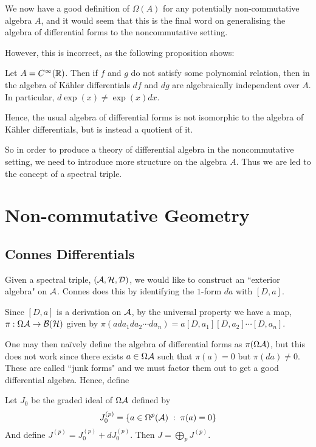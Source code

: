 We now have a good definition of $\Omega(A)$ for any potentially
non-commutative algebra $A$, and it would seem that this is the final
word on generalising the algebra of differential forms to the noncommutative setting.

However, this is incorrect, as the following proposition shows:
\begin{proposition}
    Let $A = C^\infty(\mathbb{R})$. Then if $f$ and $g$ do not satisfy some polynomial relation,
    then in the algebra of K\"ahler differentials $df$ and $dg$ are algebraically
    independent over $A$. In particular, $d\exp(x) \neq \exp(x)dx$. 
\end{proposition}

Hence, the usual algebra of differential forms is not isomorphic
to the algebra of K\"ahler differentials, but is instead a quotient of it. 

So in order to produce a theory of differential algebra in the noncommutative setting, we
need to introduce more structure on the algebra $A$. Thus we are
led to the concept of a spectral triple.

\section*{Non-commutative Geometry}
\subsection{Connes Differentials}
Given a spectral triple, $(\mathcal{A},\mathcal{H},\mathcal{D})$, we would like to construct an ``exterior algebra"
on $\mathcal{A}$. Connes does this by identifying the $1$-form $da$ with $[D,a]$.

Since $[D,a]$ is a derivation on $\mathcal{A}$, by the universal property we have a map, $\pi:\Omega\mathcal{A}\rightarrow \mathcal{B}(\mathcal{H})$
given by $\pi(ada_1da_2\cdots da_n) = a[D,a_1][D,a_2]\cdots[D,a_n]$.

One may then na\"ively define the algebra of differential forms as $\pi(\Omega \mathcal{A})$,
but this does not work since there exists $a \in \Omega \mathcal{A}$ such that $\pi(a) = 0$
but $\pi(da) \neq 0$. These are called ``junk forms" and we must factor them out to get
a good differential algebra. Hence, define
\begin{theorem}
    Let $J_0$ be the graded ideal of $\Omega \mathcal{A}$ defined by 
    \begin{equation*}
        J_0^{(p)} = \{a \in \Omega^p(\mathcal{A}) \;:\; \pi(a) = 0\}
    \end{equation*}
    And define $J^{(p)} = J_0^{(p)} + dJ_0^{(p)}$. Then $J = \bigoplus_p J^{(p)}$.
\end{theorem}

